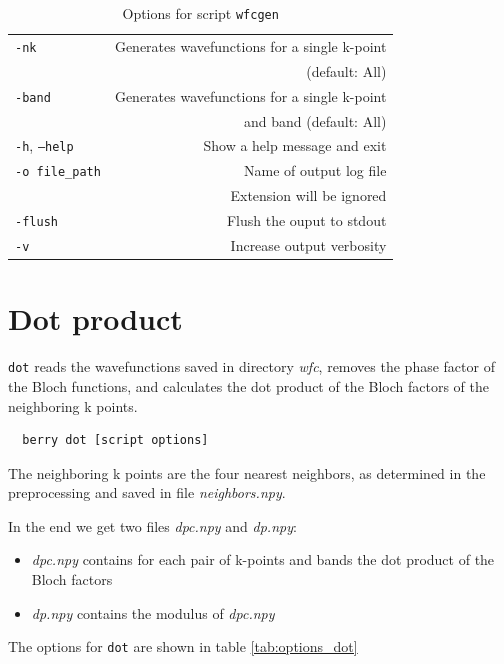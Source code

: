 \documentclass[a4paper,12pt]{report}
\begin{document}
\begin{table}[h]
 \centering
 \caption{Options for script \texttt{wfcgen}}\label{tab:options_wfcgen}
\begin{tabular}[]{lr}
\hline
  \texttt{-nk}                  & Generates wavefunctions for a single k-point  \\
                                &  (default: All) \\
  \texttt{-band}                & Generates wavefunctions for a single k-point\\
                                &  and band (default: All) \\
  \texttt{-h}, \texttt{--help}  &\hspace*{2cm} Show a help message and exit \\
  \texttt{-o file\_path}        & Name of output log file\\
                                & Extension will be ignored \\
  \texttt{-flush}               & Flush the ouput to stdout \\
  \texttt{-v}                   & Increase output verbosity \\
  \hline
\end{tabular}
\end{table}


\section{Dot product}

\texttt{dot} reads the wavefunctions saved in directory \emph{wfc},
removes the phase factor of the Bloch functions, and calculates the dot product
of the Bloch factors of the neighboring k points.

\begin{verbatim}
  berry dot [script options]
\end{verbatim}

The neighboring k points are the four nearest neighbors, as determined in the preprocessing
and saved in file \emph{neighbors.npy}.

In the end we get two files \emph{dpc.npy} and \emph{dp.npy}:
\begin{itemize}
 \item \emph{dpc.npy} contains for each pair of k-points and bands the dot product of the Bloch factors
 \item \emph{dp.npy} contains the modulus of \emph{dpc.npy}
\end{itemize}
The options for \texttt{dot} are shown in table \ref{tab:options_dot}
\end{document}
